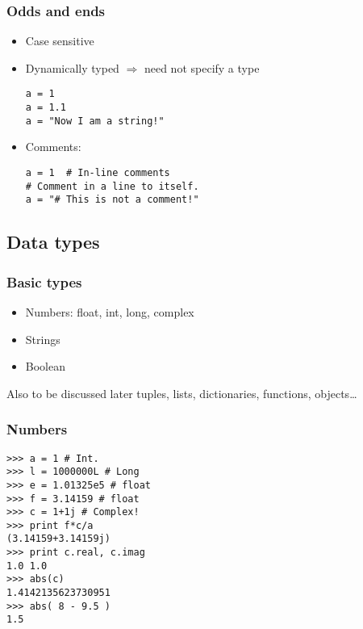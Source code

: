 \documentclass[14pt,compress]{beamer}
\newcounter{time}
\newcommand{\inctime}[1]{\addtocounter{time}{#1}{\tiny \thetime\ m}}
\begin{document}
\begin{frame}[fragile]
  \frametitle{Odds and ends}
  \begin{itemize}
    \item Case sensitive
    \item Dynamically typed $\Rightarrow$ need not specify a type
      \begin{lstlisting}
a = 1
a = 1.1
a = "Now I am a string!"
      \end{lstlisting}
    \item Comments:
      \begin{lstlisting}
a = 1  # In-line comments
# Comment in a line to itself.
a = "# This is not a comment!"
      \end{lstlisting}
  \end{itemize}
  \inctime{15}
\end{frame}


\subsection{Data types}
\begin{frame}
  \frametitle{Basic types}
  \begin{itemize}
    \item Numbers: float, int, long, complex
    \item Strings
    \item Boolean
  \end{itemize}
  \begin{block}{Also to be discussed later}
    tuples, lists, dictionaries, functions, objects\ldots
  \end{block}
\end{frame}

\begin{frame}[fragile]
  \frametitle{Numbers}
  \vspace*{-0.25in}
  \begin{lstlisting}
>>> a = 1 # Int.
>>> l = 1000000L # Long
>>> e = 1.01325e5 # float
>>> f = 3.14159 # float
>>> c = 1+1j # Complex!
>>> print f*c/a
(3.14159+3.14159j)
>>> print c.real, c.imag
1.0 1.0
>>> abs(c)
1.4142135623730951
>>> abs( 8 - 9.5 )
1.5
  \end{lstlisting}
\end{frame}
\end{document}
